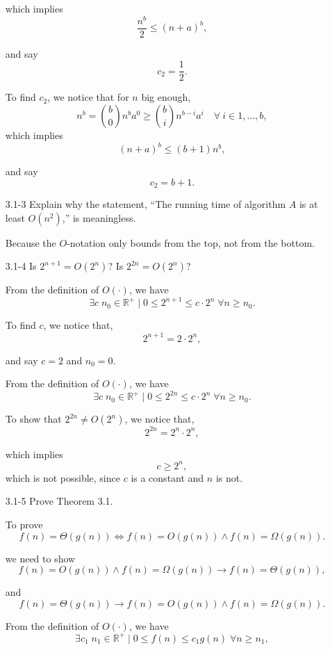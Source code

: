 \documentclass{report}
\makeatletter
\renewenvironment{framed}{%
 \def\FrameCommand##1{\hskip\@totalleftmargin
 \fboxsep=\FrameSep\fbox{##1}}%
 \MakeFramed {\advance\hsize-\width
   \@totalleftmargin\z@ \linewidth\hsize
   \@setminipage}}%
 {\par\unskip\endMakeFramed}
\DeclareMathOperator{\Exists}{\exists}
\DeclareMathOperator{\Forall}{\forall}
\makeatother
\begin{document}
\begin{enumerate}
\begin{framed}
which implies
\[
\frac{n^b}{2} \le (n + a)^b,
\]

and say
\[
c_2 = \frac{1}{2}.
\]

To find \(c_2\), we notice that for $n$ big enough,
\[
n^b = \binom{b}{0} n^b a^0
\geq \binom{b}{i} n^{b - i} a^i \quad \forall\ i \in 1, \dots ,b,
\]
which implies
\[
(n + a)^b \leq (b + 1) n^b,
\]

and say
\[
c_2 = b + 1.
\]
\end{framed}

\item[3.1{-}3]{Explain why the statement, ``The running time of algorithm $A$ is
  at least $O(n^2)$,'' is meaningless.}

\begin{framed}
Because the $O$-notation only bounds from the top, not from the bottom.
\end{framed}

\item[3.1{-}4]{Is $2^{n+1} = O(2^n)$? Is $2^{2n} = O(2^n)$?}

\begin{framed}
From the definition of $O(\cdot)$, we have
\[
\Exists c\;n_0\in\mathbb{R}^+ \mid 0 \leq 2^{n+1} \leq c \cdot 2^n\;
\Forall n \ge n_0.
\]

To find $c$, we notice that,
\[
2^{n+1} = 2 \cdot 2^n,
\]

and say $c = 2$ and $n_0 = 0$.

From the definition of $O(\cdot)$, we have
\[
\Exists c\;n_0\in\mathbb{R}^+ \mid 0 \leq 2^{2n} \leq c \cdot 2^n\;
\Forall n \ge n_0.
\]

To show that $2^{2n} \neq O(2^n)$, we notice that,
\[
2^{2n} = 2^n \cdot 2^n,
\]

which implies
\[
c \ge 2^n,
\]
which is not possible, since $c$ is a constant and $n$ is not.
\end{framed}

\item[3.1{-}5]{Prove Theorem 3.1.}

\begin{framed}
To prove
\[
f(n) = \Theta(g(n)) \iff f(n) = O(g(n)) \wedge f(n) = \Omega(g(n)).
\]

we need to show
\[
f(n) = O(g(n)) \wedge f(n) = \Omega(g(n)) \rightarrow f(n) = \Theta(g(n)),
\]

and
\[
f(n) = \Theta(g(n)) \rightarrow f(n) = O(g(n)) \wedge f(n) = \Omega(g(n)).
\]

From the definition of $O(\cdot)$, we have
\[
\Exists c_1\;n_1\in\mathbb{R}^+ \mid 0 \le f(n) \le c_1g(n)\;\Forall n \ge n_1,
\]


\end{framed}
\end{enumerate}
\end{document}
